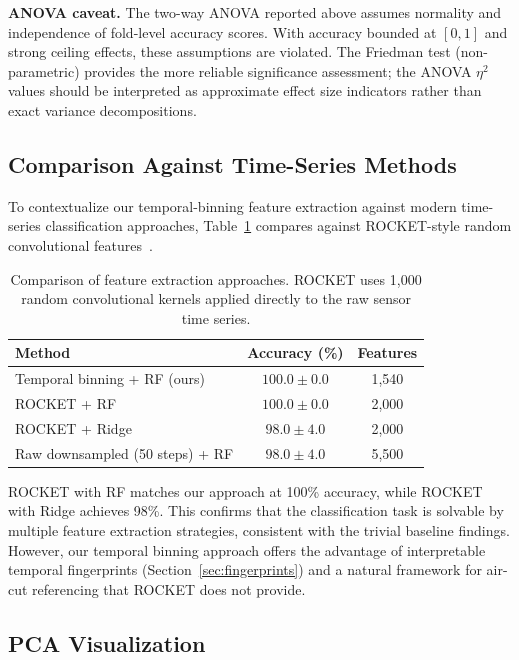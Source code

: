 \textbf{ANOVA caveat.} The two-way ANOVA reported above assumes normality and independence of fold-level accuracy scores. With accuracy bounded at $[0, 1]$ and strong ceiling effects, these assumptions are violated. The Friedman test (non-parametric) provides the more reliable significance assessment; the ANOVA $\eta^2$ values should be interpreted as approximate effect size indicators rather than exact variance decompositions.

\subsection{Comparison Against Time-Series Methods}

To contextualize our temporal-binning feature extraction against modern time-series classification approaches, Table~\ref{tab:rocket} compares against ROCKET-style random convolutional features~\cite{dempster2020rocket}.

\begin{table}[H]
\caption{Comparison of feature extraction approaches. ROCKET uses 1{,}000 random convolutional kernels applied directly to the raw sensor time series.}\label{tab:rocket}
\centering
\begin{tabular}{lcc}
\toprule
\textbf{Method} & \textbf{Accuracy (\%)} & \textbf{Features} \\
\midrule
Temporal binning + RF (ours)           & $100.0 \pm 0.0$ & 1{,}540 \\
ROCKET + RF                            & $100.0 \pm 0.0$ & 2{,}000 \\
ROCKET + Ridge                         & $98.0 \pm 4.0$  & 2{,}000 \\
Raw downsampled (50 steps) + RF        & $98.0 \pm 4.0$  & 5{,}500 \\
\bottomrule
\end{tabular}
\end{table}

ROCKET with RF matches our approach at 100\% accuracy, while ROCKET with Ridge achieves 98\%. This confirms that the classification task is solvable by multiple feature extraction strategies, consistent with the trivial baseline findings. However, our temporal binning approach offers the advantage of interpretable temporal fingerprints (Section~\ref{sec:fingerprints}) and a natural framework for air-cut referencing that ROCKET does not provide.

\subsection{PCA Visualization}

